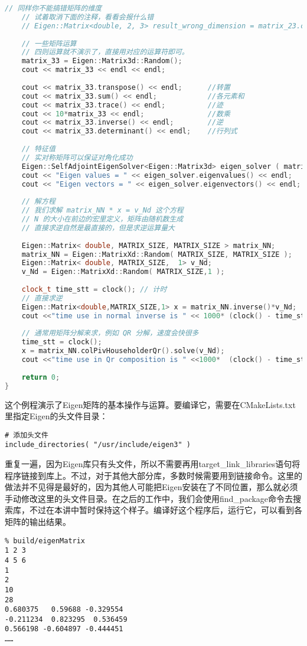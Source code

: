\begin{lstlisting}[language=c++,caption=slambook/ch3/useEigen/eigenMatrix.cpp]
	// 同样你不能搞错矩阵的维度
	// 试着取消下面的注释，看看会报什么错
	// Eigen::Matrix<double, 2, 3> result_wrong_dimension = matrix_23.cast<double>() * v_3d;
	
	// 一些矩阵运算
	// 四则运算就不演示了，直接用对应的运算符即可。
	matrix_33 = Eigen::Matrix3d::Random(); 
	cout << matrix_33 << endl << endl;
	
	cout << matrix_33.transpose() << endl;      //转置
	cout << matrix_33.sum() << endl;            //各元素和
	cout << matrix_33.trace() << endl;          //迹
	cout << 10*matrix_33 << endl;               //数乘
	cout << matrix_33.inverse() << endl;        //逆
	cout << matrix_33.determinant() << endl;    //行列式 
	
	// 特征值
	// 实对称矩阵可以保证对角化成功
	Eigen::SelfAdjointEigenSolver<Eigen::Matrix3d> eigen_solver ( matrix_33.transpose() * matrix_33 );
	cout << "Eigen values = " << eigen_solver.eigenvalues() << endl; 
	cout << "Eigen vectors = " << eigen_solver.eigenvectors() << endl; 
	
	// 解方程
	// 我们求解 matrix_NN * x = v_Nd 这个方程
	// N 的大小在前边的宏里定义，矩阵由随机数生成
	// 直接求逆自然是最直接的，但是求逆运算量大
	
	Eigen::Matrix< double, MATRIX_SIZE, MATRIX_SIZE > matrix_NN;
	matrix_NN = Eigen::MatrixXd::Random( MATRIX_SIZE, MATRIX_SIZE );
	Eigen::Matrix< double, MATRIX_SIZE,  1> v_Nd;
	v_Nd = Eigen::MatrixXd::Random( MATRIX_SIZE,1 );
	
	clock_t time_stt = clock(); // 计时
	// 直接求逆
	Eigen::Matrix<double,MATRIX_SIZE,1> x = matrix_NN.inverse()*v_Nd;
	cout <<"time use in normal inverse is " << 1000* (clock() - time_stt)/(double)CLOCKS_PER_SEC << "ms"<< endl;
	
	// 通常用矩阵分解来求，例如 QR 分解，速度会快很多
	time_stt = clock();
	x = matrix_NN.colPivHouseholderQr().solve(v_Nd);
	cout <<"time use in Qr composition is " <<1000*  (clock() - time_stt)/(double)CLOCKS_PER_SEC <<"ms" << endl;
	
	return 0;
}
\end{lstlisting}

这个例程演示了Eigen矩阵的基本操作与运算。要编译它，需要在CMakeLists.txt里指定Eigen的头文件目录：
\begin{lstlisting}
# 添加头文件
include_directories( "/usr/include/eigen3" )
\end{lstlisting}

重复一遍，因为Eigen库只有头文件，所以不需要再用target\_link\_libraries语句将程序链接到库上。不过，对于其他大部分库，多数时候需要用到链接命令。这里的做法并不见得是最好的，因为其他人可能把Eigen安装在了不同位置，那么就必须手动修改这里的头文件目录。在之后的工作中，我们会使用find\_package命令去搜索库，不过在本讲中暂时保持这个样子。编译好这个程序后，运行它，可以看到各矩阵的输出结果。
\begin{lstlisting}
% build/eigenMatrix
1 2 3
4 5 6
1
2
10
28
0.680375   0.59688 -0.329554
-0.211234  0.823295  0.536459
0.566198 -0.604897 -0.444451
……
\end{lstlisting}

